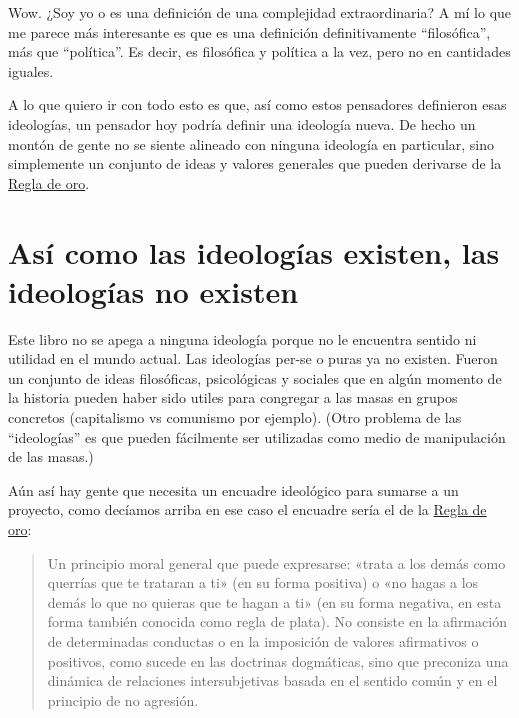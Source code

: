 \documentclass[
]{book}
\begin{document}
Wow. ¿Soy yo o es una definición de una complejidad extraordinaria? A mí lo que me parece más interesante es que es una definición definitivamente ``filosófica'', más que ``política''. Es decir, es filosófica y política a la vez, pero no en cantidades iguales.

A lo que quiero ir con todo esto es que, así como estos pensadores definieron esas ideologías, un pensador hoy podría definir una ideología nueva. De hecho un montón de gente no se siente alineado con ninguna ideología en particular, sino simplemente un conjunto de ideas y valores generales que pueden derivarse de la \href{https://es.wikipedia.org/wiki/Regla_de_oro_(\%C3\%A9tica)}{Regla de oro}.

\hypertarget{asuxed-como-las-ideologuxedas-existen-las-ideologuxedas-no-existen}{%
\section{Así como las ideologías existen, las ideologías no existen}\label{asuxed-como-las-ideologuxedas-existen-las-ideologuxedas-no-existen}}

Este libro no se apega a ninguna ideología porque no le encuentra sentido ni utilidad en el mundo actual. Las ideologías per-se o puras ya no existen. Fueron un conjunto de ideas filosóficas, psicológicas y sociales que en algún momento de la historia pueden haber sido utiles para congregar a las masas en grupos concretos (capitalismo vs comunismo por ejemplo). (Otro problema de las ``ideologías'' es que pueden fácilmente ser utilizadas como medio de manipulación de las masas.)

Aún así hay gente que necesita un encuadre ideológico para sumarse a un proyecto, como decíamos arriba en ese caso el encuadre sería el de la \href{https://es.wikipedia.org/wiki/Regla_de_oro_(\%C3\%A9tica)}{Regla de oro}:

\begin{quote}
Un principio moral general que puede expresarse: «trata a los demás como querrías que te trataran a ti» (en su forma positiva) o «no hagas a los demás lo que no quieras que te hagan a ti» (en su forma negativa, en esta forma también conocida como regla de plata). No consiste en la afirmación de determinadas conductas o en la imposición de valores afirmativos o positivos, como sucede en las doctrinas dogmáticas, sino que preconiza una dinámica de relaciones intersubjetivas basada en el sentido común y en el principio de no agresión.
\end{quote}
\end{document}
